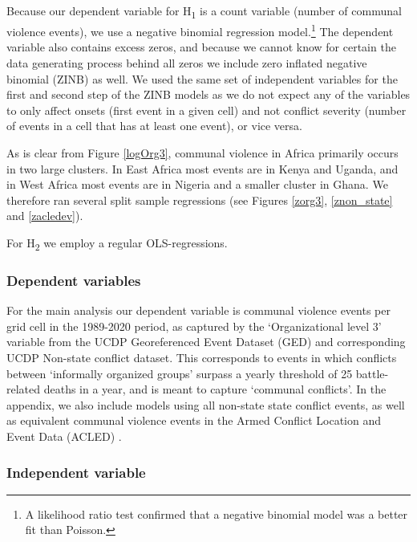 Because our dependent variable for H\textsubscript{1} is a count variable
(number of communal violence events), we use a negative binomial regression
model.\footnote{A likelihood ratio test confirmed that a negative binomial model
was a better fit than Poisson.} The dependent variable also contains excess
zeros, and because we cannot know for certain the data generating process behind
all zeros we include zero inflated negative binomial (ZINB) as well. We used the
same set of independent variables for the first and second step of the ZINB
models as we do not expect any of the variables to only affect onsets (first
event in a given cell) and not conflict severity (number of events in a cell
that has at least one event), or vice versa.

As is clear from Figure \ref{logOrg3}, communal violence in Africa primarily
occurs in two large clusters. In East Africa most events are in Kenya and
Uganda, and in West Africa most events are in Nigeria and a smaller cluster in
Ghana. We therefore ran several split sample regressions (see Figures \ref{zorg3},
\ref{znon_state} and \ref{zacledev}).


For H\textsubscript{2} we employ a regular OLS-regressions. 

\subsubsection{Dependent variables} \label{Dependent variable}

For the main analysis our dependent variable is communal violence events per
grid cell in the 1989-2020 period, as captured by the `Organizational level 3'
variable from the UCDP Georeferenced Event Dataset (GED) and corresponding UCDP
Non-state conflict dataset. This corresponds to events in which conflicts
between `informally organized groups' surpass a yearly threshold of 25
battle-related deaths in a year, and is meant to capture `communal conflicts'.
In the appendix, we also include models using all non-state state conflict
events, as well as equivalent communal violence events in the Armed Conflict
Location and Event Data (ACLED) \citep{Raleigh_2010}.

\subsubsection{Independent variable} \label{Independent variable}

